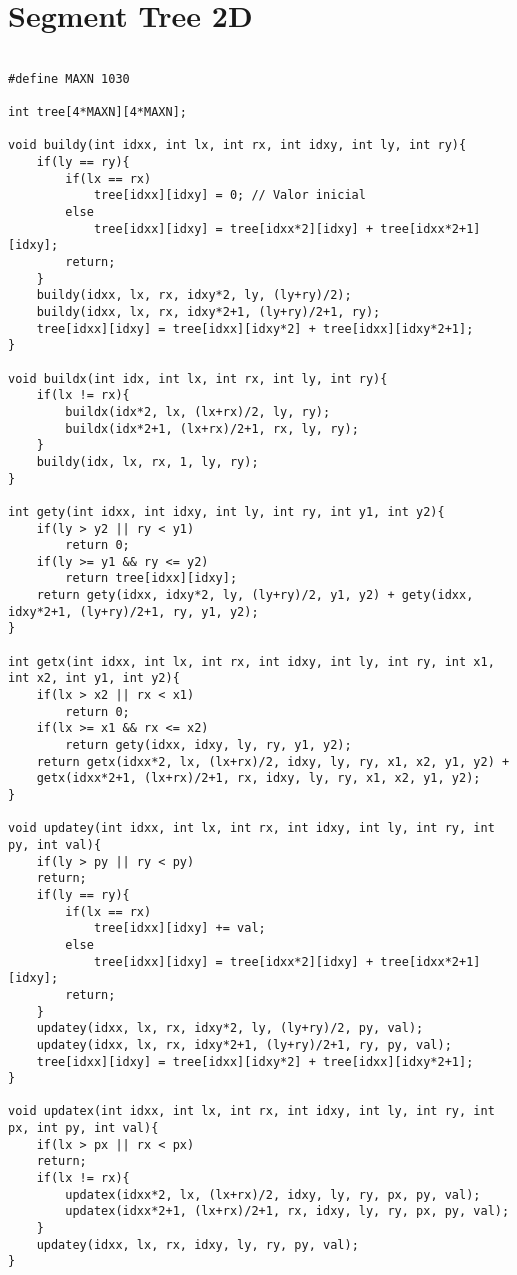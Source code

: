 \section{Segment Tree 2D}

\begin{multicols}{2}
	\begin{lstlisting}

#define MAXN 1030

int tree[4*MAXN][4*MAXN];

void buildy(int idxx, int lx, int rx, int idxy, int ly, int ry){
	if(ly == ry){
		if(lx == rx)
			tree[idxx][idxy] = 0; // Valor inicial
		else
			tree[idxx][idxy] = tree[idxx*2][idxy] + tree[idxx*2+1][idxy];
		return;
	}
	buildy(idxx, lx, rx, idxy*2, ly, (ly+ry)/2);
	buildy(idxx, lx, rx, idxy*2+1, (ly+ry)/2+1, ry);
	tree[idxx][idxy] = tree[idxx][idxy*2] + tree[idxx][idxy*2+1];
}

void buildx(int idx, int lx, int rx, int ly, int ry){
	if(lx != rx){
		buildx(idx*2, lx, (lx+rx)/2, ly, ry);
		buildx(idx*2+1, (lx+rx)/2+1, rx, ly, ry);
	}
	buildy(idx, lx, rx, 1, ly, ry);
}

int gety(int idxx, int idxy, int ly, int ry, int y1, int y2){
	if(ly > y2 || ry < y1)
		return 0;
	if(ly >= y1 && ry <= y2)
		return tree[idxx][idxy];
	return gety(idxx, idxy*2, ly, (ly+ry)/2, y1, y2) + gety(idxx, idxy*2+1, (ly+ry)/2+1, ry, y1, y2);
}

int getx(int idxx, int lx, int rx, int idxy, int ly, int ry, int x1, int x2, int y1, int y2){
	if(lx > x2 || rx < x1)
		return 0;
	if(lx >= x1 && rx <= x2)
		return gety(idxx, idxy, ly, ry, y1, y2);
	return getx(idxx*2, lx, (lx+rx)/2, idxy, ly, ry, x1, x2, y1, y2) +
	getx(idxx*2+1, (lx+rx)/2+1, rx, idxy, ly, ry, x1, x2, y1, y2);
}

void updatey(int idxx, int lx, int rx, int idxy, int ly, int ry, int py, int val){
	if(ly > py || ry < py)
	return;
	if(ly == ry){
		if(lx == rx)
			tree[idxx][idxy] += val;
		else
			tree[idxx][idxy] = tree[idxx*2][idxy] + tree[idxx*2+1][idxy];
		return;
	}
	updatey(idxx, lx, rx, idxy*2, ly, (ly+ry)/2, py, val);
	updatey(idxx, lx, rx, idxy*2+1, (ly+ry)/2+1, ry, py, val);
	tree[idxx][idxy] = tree[idxx][idxy*2] + tree[idxx][idxy*2+1];
}

void updatex(int idxx, int lx, int rx, int idxy, int ly, int ry, int px, int py, int val){
	if(lx > px || rx < px)
	return;
	if(lx != rx){
		updatex(idxx*2, lx, (lx+rx)/2, idxy, ly, ry, px, py, val);
		updatex(idxx*2+1, (lx+rx)/2+1, rx, idxy, ly, ry, px, py, val);
	}
	updatey(idxx, lx, rx, idxy, ly, ry, py, val);
}

	\end{lstlisting}
\end{multicols}